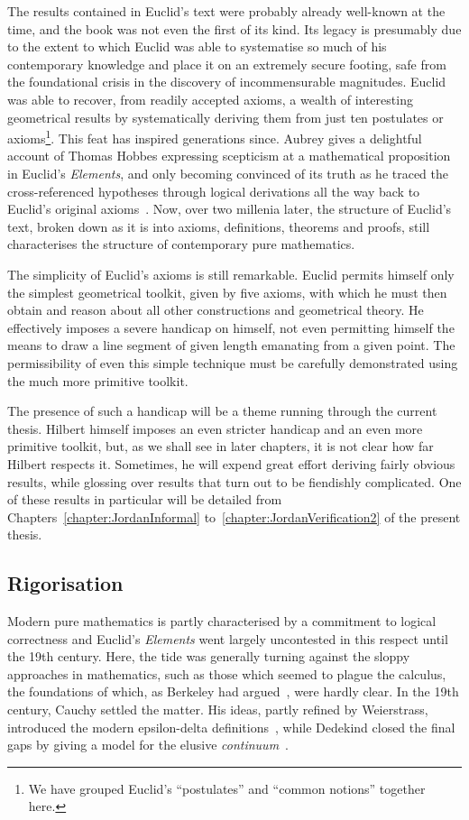 The results contained in Euclid's text were probably already well-known at the time, and the book was not even the first of its kind. Its legacy is presumably due to the extent to which Euclid was able to systematise so much of his contemporary knowledge and place it on an extremely secure footing, safe from the foundational crisis in the discovery of incommensurable magnitudes. Euclid was able to recover, from readily accepted axioms, a wealth of interesting geometrical results by systematically deriving them from just ten postulates or axioms\footnote{We have grouped Euclid's ``postulates'' and ``common notions'' together here.}. This feat has inspired generations since. Aubrey gives a delightful account of Thomas Hobbes expressing scepticism at a mathematical proposition in Euclid's \emph{Elements}, and only becoming convinced of its truth as he traced the cross-referenced hypotheses through logical derivations all the way back to Euclid's original axioms~\cite{ElementaryGeometryRoe}. Now, over two millenia later, the structure of Euclid's text, broken down as it is into axioms, definitions, theorems and proofs, still characterises the structure of contemporary pure mathematics.

The simplicity of Euclid's axioms is still remarkable. Euclid permits himself only the simplest geometrical toolkit, given by five axioms, with which he must then obtain and reason about all other constructions and geometrical theory. He effectively imposes a severe handicap on himself, not even permitting himself the means to draw a line segment of given length emanating from a given point. The permissibility of even this simple technique must be carefully demonstrated using the much more primitive toolkit.

The presence of such a handicap will be a theme running through the current thesis. Hilbert himself imposes an even stricter handicap and an even more primitive toolkit, but, as we shall see in later chapters, it is not clear how far Hilbert respects it. Sometimes, he will expend great effort deriving fairly obvious results, while glossing over results that turn out to be fiendishly complicated. One of these results in particular will be detailed from Chapters~\ref{chapter:JordanInformal} to~\ref{chapter:JordanVerification2} of the present thesis.

\subsection{Rigorisation}
Modern pure mathematics is partly characterised by a commitment to logical correctness and Euclid's \emph{Elements} went largely uncontested in this respect until the 19th century. Here, the tide was generally turning against the sloppy approaches in mathematics, such as those which seemed to plague the calculus, the foundations of which, as Berkeley had argued~\cite{BerkeleyNewton}, were hardly clear. In the 19th century, Cauchy settled the matter. His ideas, partly refined by Weierstrass, introduced the modern epsilon-delta definitions~\cite{RigorousCalculus}, while Dedekind closed the final gaps by giving a model for the elusive \emph{continuum}~\cite{DedekindsCuts}. 

